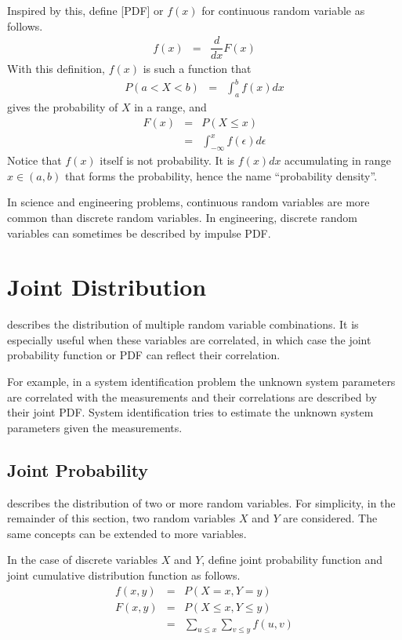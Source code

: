 Inspired by this, define [PDF] or $f(x)$ for continuous random variable as follows. 
\begin{eqnarray}
f(x) &=& \dfrac{d}{dx}F(x) \nonumber
\end{eqnarray}
With this definition, $f(x)$ is such a function that
\begin{eqnarray}
  P(a < X < b) &=& \int_{a}^{b}f(x)dx \nonumber
\end{eqnarray}
gives the probability of $X$ in a range, and
\begin{eqnarray}
  F(x) &=& P(X\leq x) \nonumber \\
  &=& \int_{-\infty}^{x} f(\epsilon)d\epsilon \nonumber
\end{eqnarray}
Notice that $f(x)$ itself is not probability. It is $f(x)dx$ accumulating in range $x \in (a, b)$ that forms the probability, hence the name ``probability density''.

In science and engineering problems, continuous random variables are more common than discrete random variables. In engineering, discrete random variables can sometimes be described by impulse PDF.

\section{Joint Distribution}

 describes the distribution of multiple random variable combinations. It is especially useful when these variables are correlated, in which case the joint probability function or PDF can reflect their correlation. 

For example, in a system identification problem the unknown system parameters are correlated with the measurements and their correlations are described by their joint PDF. System identification tries to estimate the unknown system parameters given the measurements.

\subsection{Joint Probability}

 describes the distribution of two or more random variables. For simplicity, in the remainder of this section, two random variables $X$ and $Y$ are considered. The same concepts can be extended to more variables.

In the case of discrete variables $X$ and $Y$, define joint probability function and joint cumulative distribution function as follows.
\begin{eqnarray}
  f(x, y) &=& P\left(X=x, Y=y\right) \nonumber \\
  F(x, y) &=& P\left(X\leq x, Y\leq y\right) \nonumber \\
  &=& \sum_{u\leq x}\sum_{v\leq y}f(u, v) \nonumber
\end{eqnarray}

